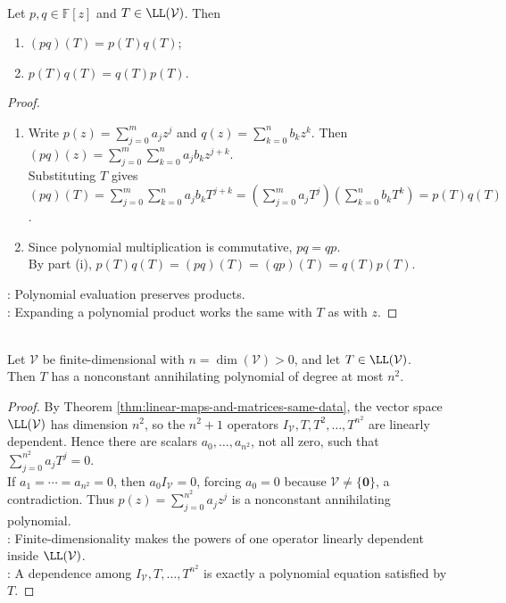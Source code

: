 \begin{proposition} \label{prop:operator-polynomial-products} \\
Let $p,q\in\mathbb{F}[z]$ and $T\in\LL(\mathcal{V})$. Then
\begin{enumerate}[label=(\roman*)]
\setlength{\itemsep}{0pt}
\item $(pq)(T)=p(T)q(T)$;
\item $p(T)q(T)=q(T)p(T)$.
\end{enumerate}
\begin{proof}
\begin{enumerate}[label=(\roman*)]
\setlength{\itemsep}{0pt}
\item Write $p(z)=\sum_{j=0}^{m}a_jz^j$ and $q(z)=\sum_{k=0}^{n}b_kz^k$. Then $(pq)(z)=\sum\limits_{j=0}^{m}\sum\limits_{k=0}^{n}a_jb_kz^{j+k}$.\\
Substituting $T$ gives $(pq)(T)=\sum\limits_{j=0}^{m}\sum\limits_{k=0}^{n}a_jb_kT^{j+k} =\left(\sum\limits_{j=0}^{m}a_jT^j\right)\left(\sum\limits_{k=0}^{n}b_kT^k\right) =p(T)q(T)$.
\item Since polynomial multiplication is commutative, $pq=qp$.\\
By part (i), $p(T)q(T)=(pq)(T)=(qp)(T)=q(T)p(T)$.
\end{enumerate}
: Polynomial evaluation preserves products.\\
: Expanding a polynomial product works the same with $T$ as with $z$.
\end{proof}
\end{proposition}

\begin{proposition} \label{prop:finite-dimensional-operators-have-annihilating-polynomials} \\
Let $\mathcal{V}$ be finite-dimensional with $n=\dim(\mathcal{V})>0$, and let $T\in\LL(\mathcal{V})$.\\
Then $T$ has a nonconstant annihilating polynomial of degree at most $n^2$.
\begin{proof}
By Theorem \ref{thm:linear-maps-and-matrices-same-data}, the vector space $\LL(\mathcal{V})$ has dimension $n^2$, so the $n^2+1$ operators $I_{\mathcal{V}},T,T^2,\ldots,T^{n^2}$ are linearly dependent. Hence there are scalars $a_0,\ldots,a_{n^2}$, not all zero, such that $\sum_{j=0}^{n^2}a_jT^j=0$.\\
If $a_1=\cdots=a_{n^2}=0$, then $a_0I_{\mathcal{V}}=0$, forcing $a_0=0$ because $\mathcal{V}\neq\{\mathbf{0}\}$, a contradiction. Thus $p(z)=\sum_{j=0}^{n^2}a_jz^j$ is a nonconstant annihilating polynomial.\\
: Finite-dimensionality makes the powers of one operator linearly dependent inside $\LL(\mathcal{V})$.\\
: A dependence among $I_{\mathcal{V}},T,\ldots,T^{n^2}$ is exactly a polynomial equation satisfied by $T$.
\end{proof}
\end{proposition}

